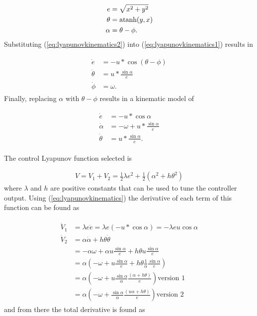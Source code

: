 \begin{align}
\label{eq:lyapunovkinematics2}
\begin{split}
e &= \sqrt{x^2+y^2} \\
\theta &= \mathop{\text{atanh}}(y,x) \\
\alpha &= \theta - \phi.
\end{split}
\end{align}
Substituting (\ref{eq:lyapunovkinematics2}) into (\ref{eq:lyapunovkinematics1}) results in

\begin{align}
\label{eq:lyapunovkinematics3}
\begin{split}
\dot{e} &= -u*\cos(\theta-\phi) \\
\dot{\theta} &= u*\frac{\sin\alpha}{e} \\
\dot{\phi} &= \omega.
\end{split}
\end{align}
Finally, replacing $\alpha$ with $\theta-\phi$ results in a kinematic model of

\begin{align}
\label{eq:lyapunovkinematics}
\begin{split}
\dot{e} &= -u*\cos\alpha \\
\dot{\alpha} &= -\omega + u*\frac{\sin\alpha}{e} \\
\dot{\theta} &= u*\frac{\sin\alpha}{e}.
\end{split}
\end{align}

The control Lyapunov function selected is

\begin{align}
\label{eq:lyapunovfunction}
V = V_1 + V_2 = \frac{1}{2}\lambda e^2 + \frac{1}{2}\left(\alpha^2+h\theta^2\right)
\end{align}
where $\lambda$ and $h$ are positive constants that can be used to tune the controller output. Using (\ref{eq:lyapunovkinematics}) the derivative of each term of this function can be found as

\begin{align}
\label{eq:Vderivatives}
\begin{split}
\dot{V}_1 &= \lambda e\dot{e} = \lambda e (-u*\cos\alpha) = -\lambda eu\cos\alpha \\
\dot{V}_2 &= \alpha\dot{\alpha}+h\theta\dot{\theta} \\
&= -\alpha\omega + \alpha u\frac{\sin\alpha}{e} + h\theta u\frac{\sin\alpha}{e} \\
&= \alpha\left(-\omega + u\frac{\sin\alpha}{e} + h\theta\frac{1}{\alpha}\frac{\sin\alpha}{e}\right) \\
&= \alpha\left(-\omega + u\frac{\sin\alpha}{\alpha}\frac{(\alpha+h\theta)}{e}\right) \text{version 1} \\
&= \alpha\left(-\omega + \frac{\sin\alpha}{\alpha}\frac{(u\alpha+h\theta)}{e}\right) \text{version 2}
\end{split}
\end{align}
and from there the total derivative is found as

